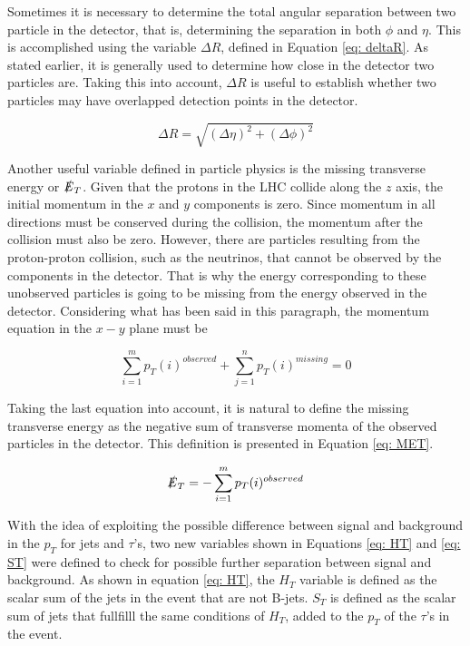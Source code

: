 Sometimes it is necessary to determine the total angular separation between two particle in the detector, that is, determining the separation in both $\phi$ and $\eta$. This is accomplished using the variable $\Delta R$, defined in Equation \ref{eq: deltaR}. As stated earlier, it is generally used to determine how close in the detector two particles are. Taking this into account, $\Delta R$ is useful to establish whether two particles may have overlapped detection points in the detector. 

\begin{equation}\label{eq: deltaR}
\Delta R = \sqrt{\left(\Delta \eta\right)^{2} + \left(\Delta \phi \right)^{2}}
\end{equation}

Another useful variable defined in particle physics is the missing transverse energy or $\slashed{E}_{T}$. Given that the protons in the LHC collide along the $z$ axis, the initial momentum in the $x$ and $y$ components is zero. Since momentum in all directions must be conserved during the collision, the momentum after the collision must also be zero. However, there are particles resulting from the proton-proton collision, such as the neutrinos, that cannot be observed by the components in the detector. That is why the energy corresponding to these unobserved particles is going to be missing from the energy observed in the detector. Considering what has been said in this paragraph, the momentum equation in the $x-y$ plane must be

$$ \sum_{i=1}^{m} p_{T}(i)^{observed} + \sum_{j=1}^{n} p_{T}(i)^{missing} = 0 $$

Taking the last equation into account, it is natural to define the missing transverse energy as the negative sum of transverse momenta of the observed particles in the detector. This definition is presented in Equation \ref{eq: MET}.

\begin{equation}\label{eq: MET}
\slashed{E}_{T} = -\sum_{i=1}^{m} p_{T}(i)^{observed}
\end{equation}  



With the idea of exploiting the possible difference between signal and background in the $p_{T}$ for jets and $\tau$'s, two new variables shown in Equations \ref{eq: HT} and \ref{eq: ST} were defined to check for possible further separation between signal and background. As shown in equation \ref{eq: HT}, the $H_{T}$ variable is defined as the scalar sum of the jets in the event that are not B-jets. $S_{T}$ is defined as the scalar sum of jets that fullfilll the same conditions of $H_{T}$, added to the $p_{T}$ of the $\tau$'s in the event.



